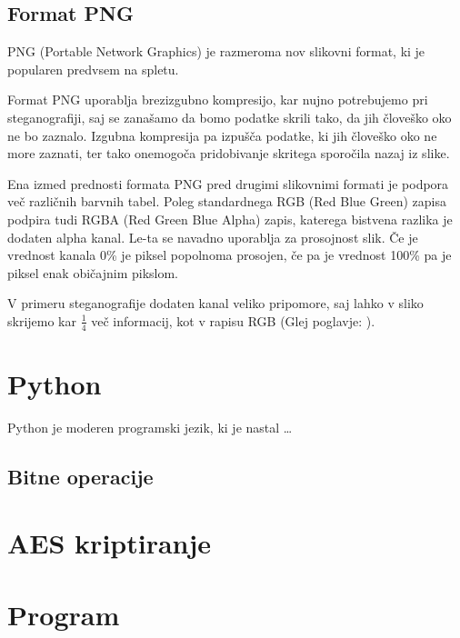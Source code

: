 \documentclass[a4paper, 12pt]{article}
\begin{document}
    \subsection{Format PNG}
        PNG (Portable Network Graphics) je razmeroma nov slikovni format, ki je popularen predvsem na spletu.

        Format PNG uporablja brezizgubno kompresijo, kar nujno potrebujemo pri steganografiji, saj se zanašamo da bomo podatke skrili tako, da jih človeško oko ne bo zaznalo. Izgubna kompresija pa izpušča podatke, ki jih človeško oko ne more zaznati, ter tako onemogoča pridobivanje skritega sporočila nazaj iz slike.

        Ena izmed prednosti formata PNG pred drugimi slikovnimi formati je podpora več različnih barvnih tabel. Poleg standardnega RGB (Red Blue Green) zapisa podpira tudi RGBA (Red Green Blue Alpha) zapis, katerega bistvena razlika je dodaten alpha kanal. Le-ta se navadno uporablja za prosojnost slik. Če je vrednost kanala 0\% je piksel popolnoma prosojen, če pa je vrednost 100\% pa je piksel enak običajnim pikslom.

        V primeru steganografije dodaten kanal veliko pripomore, saj lahko v sliko skrijemo kar $\frac{1}{4}$ več informacij, kot v rapisu RGB (Glej poglavje: ).




\section{Python}
    Python je moderen programski jezik, ki je nastal \ldots

    \subsection{Bitne operacije}

\section{AES kriptiranje}

\section{Program}
\end{document}
